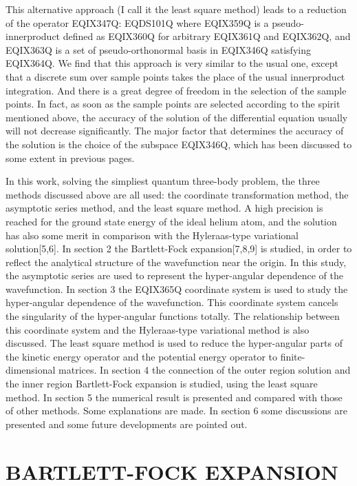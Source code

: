 This alternative approach (I call it the least square method)
leads to a reduction of the operator EQIX347Q:
 EQDS101Q 
where EQIX359Q is a pseudo-innerproduct defined as
EQIX360Q for arbitrary EQIX361Q
and EQIX362Q, and EQIX363Q is a set of pseudo-orthonormal basis in
EQIX346Q satisfying EQIX364Q.
We find that this approach is very similar to the usual one, except that
a discrete sum over sample points takes the place of the usual innerproduct
integration. And there is a great degree of freedom in the selection of the sample
points. In fact, as soon as the sample points are selected according to the
spirit mentioned above, the accuracy of the solution of the differential
equation usually will not decrease significantly. The major factor that determines
the accuracy of the solution is the choice of the subspace EQIX346Q, which
has been discussed to some extent in previous pages.

In this work, solving the simpliest quantum three-body problem, the three methods
discussed above are all used: the coordinate transformation method,
the asymptotic series method, and the least square method. A high
precision is reached for the ground state energy of the ideal helium atom, and
the solution has also some merit in comparison with the Hyleraas-type variational
solution[5,6]. In section 2 the Bartlett-Fock expansion[7,8,9]
is studied, in order to
reflect the analytical structure of the wavefunction near the origin.
In this study, the asymptotic series are used to represent the hyper-angular
dependence of the wavefunction. In section 3 the EQIX365Q coordinate system is
used to study the hyper-angular dependence of the wavefunction. This coordinate
system cancels the singularity of the hyper-angular functions totally. The
relationship between this coordinate system and the Hyleraas-type variational
method is also discussed. The least square method is used to 
reduce the hyper-angular parts of the kinetic
energy operator and the potential energy operator to finite-dimensional
matrices. In section 4 the connection
of the outer region solution and the inner region
Bartlett-Fock expansion is studied,
using the least square method. In section 5 the numerical result is presented
and compared with those of other methods. Some explanations are made. In section
6 some discussions are presented and some future developments are pointed out.

\section{BARTLETT-FOCK EXPANSION}

